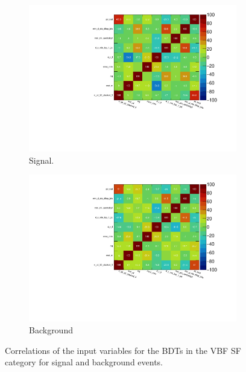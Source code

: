 \begin{figure}[htb]
    \centering
    \begin{subfigure}[t]{0.7\textwidth}
        \includegraphics[width=\textwidth]{./plots/mva/variable_reduction/VBF_SF_CorrelationMatrixS.pdf}
        \caption{Signal.}
    \end{subfigure}
    \begin{subfigure}[t]{0.7\textwidth}
        \includegraphics[width=\textwidth]{./plots/mva/variable_reduction/VBF_SF_CorrelationMatrixB.pdf}
        \caption{Background}
    \end{subfigure}
    \caption{Correlations of the input variables for the BDTs in the VBF SF category for signal and background events.}\label{fig:mva:variables:correlationsb:vbfsf}
\end{figure}

